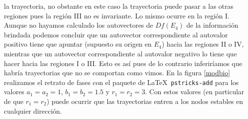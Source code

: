 la trayectoria, no obstante en este caso la trayectoria puede
pasar a las otras regiones pues la región III no es invariante. Lo
mismo ocurre en la región I. Aunque no hayamos calculado los
autovectores de $Df(E_4)$ de la información brindada podemos
concluir que un autovector correspondiente al autovalor positivo
tiene que apuntar (supuesto su origen en $E_4$) hacia las regiones
II o IV, mientras que un autovector correspondiente al autovalor
negativo lo tiene que hacer hacia las regiones I o III. Esto es
así pues de lo contrario inferiríamos que habría trayectorias que
no se comportan como vimos. En la figura \ref{modbio} realizamos
el retrato de fases con el paquete de \LaTeX\, \verb"pstricks-add"
para los valores $a_1=a_2=1$, $b_1=b_2=1.5$ y $r_1=r_2=3$. Con
estos valores (en particular de que $r_1=r_2$) puede ocurrir que
las trayectorias entren a los nodos estables en cualquier
dirección.

